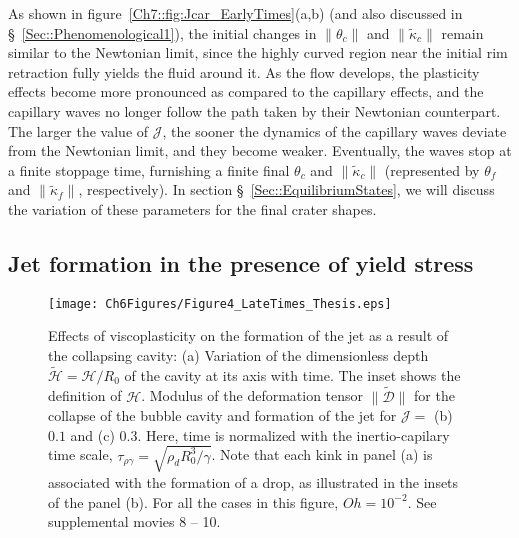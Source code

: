 As shown in figure~\ref{Ch7::fig:Jcar_EarlyTimes}(a,b) (and also discussed in \S~\ref{Sec::Phenomenological1}), the initial changes in $\|\theta_c\|$ and $\|\tilde \kappa_c\|$ remain similar to the Newtonian limit, since the highly curved region near the initial rim retraction fully yields the fluid around it. As the flow develops, the plasticity effects become more pronounced as compared to the capillary effects, and the capillary waves no longer follow the path taken by their Newtonian counterpart.
The larger the value of $\mathcal{J}$, the sooner the dynamics of the capillary waves deviate from the Newtonian limit, and they become weaker. Eventually, the waves stop at a finite stoppage time, furnishing a finite final $\theta_c$ and $\|\tilde \kappa_c\|$ (represented by $\theta_f$ and $\|\tilde \kappa_f\|$, respectively). In section \S~\ref{Sec::EquilibriumStates}, we will discuss the variation of these parameters for the final crater shapes.

\subsection{Jet formation in the presence of yield stress}\label{Sec::JetFormation}

\begin{sidewaysfigure}
	\centering
	\texttt{[image: Ch6Figures/Figure4\_LateTimes\_Thesis.eps]}
	\caption{Effects of viscoplasticity on the formation of the jet as a result of the collapsing cavity: (a) Variation of the dimensionless depth $\tilde{\mathcal{H}} = \mathcal{H}/R_0$ of the cavity at its axis with time. The inset shows the definition of $\mathcal{H}$. Modulus of the deformation tensor $\|\boldsymbol{\tilde{\mathcal{D}}}\|$ for the collapse of the bubble cavity and formation of the jet for $\mathcal{J} =$ (b) $0.1$ and (c) $0.3$. Here, time is normalized with the inertio-capilary time scale, $\tau_{\rho\gamma} = \sqrt{\rho_d R_0^3/\gamma}$. Note that each kink in panel (a) is associated with the formation of a drop, as illustrated in the insets of the panel (b). For all the cases in this figure, $Oh = 10^{-2}$. See supplemental movies {\color{Myfig} 8 -- 10}.}
	\label{Ch7::fig:Jcar_LateTimes}
\end{sidewaysfigure}

